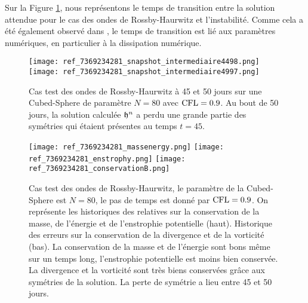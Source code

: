 Sur la Figure \ref{fig: rossby 4550}, nous représentons le temps de transition entre la solution attendue pour le cas des ondes de Rossby-Haurwitz et l'instabilité. Comme cela a été également observé dans \cite{Ullrich2011, Ullrich2010}, le temps de transition est lié aux paramètres numériques, en particulier à la dissipation numérique.

\begin{figure}[htbp]
\begin{center}
\texttt{[image: ref\_7369234281\_snapshot\_intermediaire4498.png]}
\texttt{[image: ref\_7369234281\_snapshot\_intermediaire4997.png]}
\end{center}
\caption{Cas test des ondes de Rossby-Haurwitz à 45 et 50 jours sur une Cubed-Sphere de paramètre $N=80$ avec $\text{CFL}=0.9$. Au bout de 50 jours, la solution calculée $\mathfrak{h}^n$ a perdu une grande partie des symétries qui étaient présentes au temps $t=45$.}
\label{fig: rossby 4550}
\end{figure}

\begin{figure}[htbp]
\begin{center}
\texttt{[image: ref\_7369234281\_massenergy.png]}
\texttt{[image: ref\_7369234281\_enstrophy.png]}
\texttt{[image: ref\_7369234281\_conservationB.png]}
\end{center}
\caption{Cas test des ondes de Rossby-Haurwitz, le paramètre de la Cubed-Sphere est $N=80$, le pas de temps est donné par $\text{CFL}=0.9$. On représente les historiques des relatives sur la conservation de la masse, de l'énergie et de l'enstrophie potentielle (haut). Historique des erreurs sur la conservation de la divergence et de la vorticité (bas). La conservation de la masse et de l'énergie sont bons même sur un temps long, l'enstrophie potentielle est moins bien conservée. La divergence et la vorticité sont très biens conservées grâce aux symétries de la solution. La perte de symétrie a lieu entre 45 et 50 jours.}
\label{fig: rossby conservation2}
\end{figure}